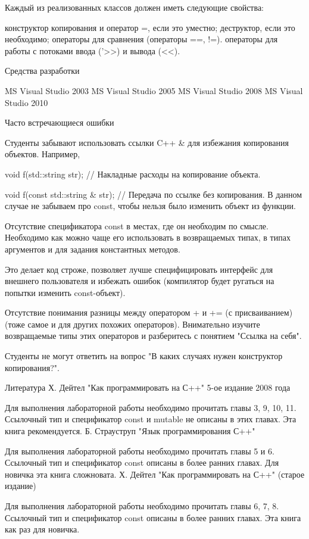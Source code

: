 \documentclass[a4paper,12pt]{article}
\begin{document}
Каждый из реализованных классов должен иметь следующие свойства:

конструктор копирования и оператор =, если это уместно;
деструктор, если это необходимо;
операторы для сравнения (операторы ==, !=).
операторы для работы с потоками ввода ('>>) и вывода (<<). 

Средства разработки

MS Visual Studio 2003
MS Visual Studio 2005
MS Visual Studio 2008
MS Visual Studio 2010 

Часто встречающиеся ошибки

Студенты забывают использовать ссылки C++ & для избежания копирования объектов. Например, 

void f(std::string str); // Накладные расходы на копирование объекта.

void f(const std::string & str); // Передача по ссылке без копирования. В данном случае не забываем про const, чтобы нельзя было изменить объект из функции.



Отсутствие спецификатора const в местах, где он необходим по смысле. Необходимо как можно чаще его использовать в возвращаемых типах, в типах аргументов и для задания константных методов. 

Это делает код строже, позволяет лучше специфицировать интерфейс для внешнего пользователя и избежать ошибок (компилятор будет ругаться на попытки изменить const-объект).

Отсутствие понимания разницы между оператором + и += (с присваиванием) (тоже самое и для других похожих операторов). Внимательно изучите возвращаемые типы этих операторов и разберитесь с понятием "Ссылка на себя". 

Студенты не могут ответить на вопрос "В каких случаях нужен конструктор копирования?". 

Литература
Х. Дейтел "Как программировать на С++" 5-ое издание 2008 года

Для выполнения лабораторной работы необходимо прочитать главы 3, 9, 10, 11. Ссылочный тип и спецификатор const и mutable не описаны в этих главах. Эта книга рекомендуется.
Б. Страуструп "Язык программирования С++"

Для выполнения лабораторной работы необходимо прочитать главы 5 и 6. Ссылочный тип и спецификатор const описаны в более ранних главах. Для новичка эта книга сложновата.
Х. Дейтел "Как программировать на С++" (старое издание)

Для выполнения лабораторной работы необходимо прочитать главы 6, 7, 8. Ссылочный тип и спецификатор const описаны в более ранних главах. Эта книга как раз для новичка.
\end{document}
